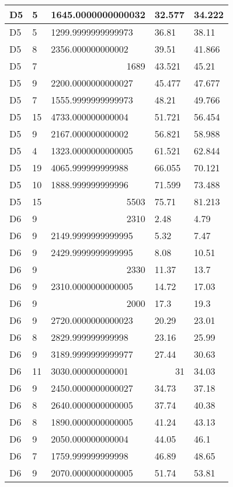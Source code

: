 \begin{longtable}{|l|l|l|l|l|}
D5 & 5 & 1645.0000000000032 & 32.577 & 34.222 \\ \hline
D5 & 5 & 1299.9999999999973 & 36.81 & 38.11 \\ \hline
D5 & 8 & 2356.000000000002 & 39.51 & 41.866 \\ \hline
D5 & 7 & \multicolumn{1}{r|}{1689} & 43.521 & 45.21 \\ \hline
D5 & 9 & 2200.0000000000027 & 45.477 & 47.677 \\ \hline
D5 & 7 & 1555.9999999999973 & 48.21 & 49.766 \\ \hline
D5 & 15 & 4733.000000000004 & 51.721 & 56.454 \\ \hline
D5 & 9 & 2167.000000000002 & 56.821 & 58.988 \\ \hline
D5 & 4 & 1323.0000000000005 & 61.521 & 62.844 \\ \hline
D5 & 19 & 4065.999999999988 & 66.055 & 70.121 \\ \hline
D5 & 10 & 1888.999999999996 & 71.599 & 73.488 \\ \hline
D5 & 15 & \multicolumn{1}{r|}{5503} & 75.71 & 81.213 \\ \hline
D6 & 9 & \multicolumn{1}{r|}{2310} & 2.48 & 4.79 \\ \hline
D6 & 9 & 2149.9999999999995 & 5.32 & 7.47 \\ \hline
D6 & 9 & 2429.9999999999995 & 8.08 & 10.51 \\ \hline
D6 & 9 & \multicolumn{1}{r|}{2330} & 11.37 & 13.7 \\ \hline
D6 & 9 & 2310.0000000000005 & 14.72 & 17.03 \\ \hline
D6 & 9 & \multicolumn{1}{r|}{2000} & 17.3 & 19.3 \\ \hline
D6 & 9 & 2720.0000000000023 & 20.29 & 23.01 \\ \hline
D6 & 8 & 2829.999999999998 & 23.16 & 25.99 \\ \hline
D6 & 9 & 3189.9999999999977 & 27.44 & 30.63 \\ \hline
D6 & 11 & 3030.000000000001 & \multicolumn{1}{r|}{31} & 34.03 \\ \hline
D6 & 9 & 2450.0000000000027 & 34.73 & 37.18 \\ \hline
D6 & 8 & 2640.0000000000005 & 37.74 & 40.38 \\ \hline
D6 & 8 & 1890.0000000000005 & 41.24 & 43.13 \\ \hline
D6 & 9 & 2050.000000000004 & 44.05 & 46.1 \\ \hline
D6 & 7 & 1759.999999999998 & 46.89 & 48.65 \\ \hline
D6 & 9 & 2070.0000000000005 & 51.74 & 53.81 \\ \hline

\end{longtable}
